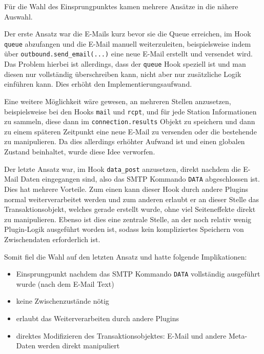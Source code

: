 Für die Wahl des Einsprungpunktes kamen mehrere Ansätze in die nähere Auswahl.

Der erste Ansatz war die E-Mails kurz bevor sie die Queue erreichen, im Hook \verb#queue# abzufangen und die E-Mail manuell weiterzuleiten, beispielsweise indem über \verb#outbound.send_email(...)# eine neue E-Mail erstellt und versendet wird. Das Problem hierbei ist allerdings, dass der \verb#queue# Hook speziell ist und man diesen nur vollständig überschreiben kann, nicht aber nur zusätzliche Logik einführen kann. Dies erhöht den Implementierungsaufwand.

Eine weitere Möglichkeit wäre gewesen, an mehreren Stellen anzusetzen, beispielsweise bei den Hooks \verb#mail# und \verb#rcpt#, und für jede Station Informationen zu sammeln, diese dann im \verb#connection.results# Objekt zu speichern und dann zu einem späteren Zeitpunkt eine neue E-Mail zu versenden oder die bestehende zu manipulieren. Da dies allerdings erhöhter Aufwand ist und einen globalen Zustand beinhaltet, wurde diese Idee verworfen.

Der letzte Ansatz war, im Hook \verb#data_post# anzusetzen, direkt nachdem die E-Mail Daten eingegangen sind, also das SMTP Kommando \verb#DATA# abgeschlossen ist. Dies hat mehrere Vorteile. Zum einen kann dieser Hook durch andere Plugins normal weiterverarbeitet werden und zum anderen erlaubt er an dieser Stelle das Transaktionsobjekt, welches gerade erstellt wurde, ohne viel Seiteneffekte direkt zu manipulieren. Ebenso ist dies eine zentrale Stelle, an der noch relativ wenig Plugin-Logik ausgeführt worden ist, sodass kein kompliziertes Speichern von Zwischendaten erforderlich ist.

Somit fiel die Wahl auf den letzten Ansatz und hatte folgende Implikationen:
\begin{itemize}
\item Einsprungpunkt nachdem das SMTP Kommando \verb#DATA# vollständig ausgeführt wurde (nach dem E-Mail Text)
\item keine Zwischenzustände nötig
\item erlaubt das Weiterverarbeiten durch andere Plugins
\item direktes Modifizieren des Transaktionsobjektes: E-Mail und andere Meta-Daten werden direkt manipuliert
\end{itemize}
